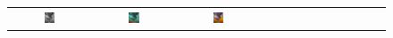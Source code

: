\documentclass[10pt,twocolumn,letterpaper]{article}
\def\acollumsize{0.14\textwidth}
\begin{document}
\begin{figure}[t!]
\begin{center}
\begin{tabular}{ ccccccccccccc }
\includegraphics[width=\acollumsize]{img/result/22_in.JPEG}&
\includegraphics[width=\acollumsize]{img/result/22.png}&
\includegraphics[width=\acollumsize]{img/result/22_gt.JPEG}& &&


\end{tabular}
\end{center}
\end{figure}
\end{document}
